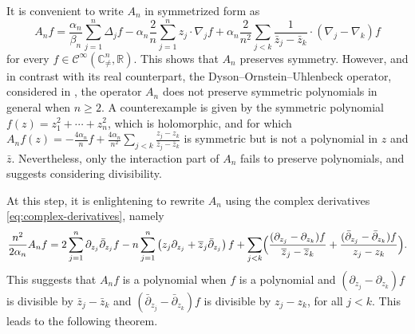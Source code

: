 \documentclass[11pt,reqno]{amsart}
\numberwithin{equation}{section}%
\numberwithin{figure}{section}%
\numberwithin{table}{section}
\theoremstyle{plain}
\theoremstyle{definition}
\begin{document}
It is convenient to write $A_n$ in symmetrized form as
\begin{equation}
  A_nf
  =\frac{\alpha_n}{\beta_n}\sum_{j=1}^n\Delta_jf
  -\alpha_n\frac{2}{n}\sum_{j=1}^nz_j\cdot\nabla_j f
  +\alpha_n\frac{2}{n^2}\sum_{j<k}\frac{1}{\bar{z}_j-\bar{z}_k}\cdot(\nabla_j-\nabla_k)f
\end{equation}
for every $f\in\mathcal{C}^\infty(\mathbb{C}^n_{\neq},\mathbb{R})$. This shows
that $A_n$ preserves symmetry. However, and in contrast with its real
counterpart, the Dyson--Ornstein--Uhlenbeck operator, considered in
\cite{ChafaiLehec}, the operator $A_n$ does not preserve symmetric polynomials
in general when $n\geq2$. A counterexample is given by the symmetric
polynomial $f(z)=z_1^2+\cdots+z_n^2$, which is holomorphic, and for which
$A_nf(z)=-\frac{4\alpha_n}{n}f+\frac{4\alpha_n}{n^2}\sum_{j<k}\frac{z_j-z_k}{\bar{z}_j-\bar{z}_k}$
is symmetric but is not a polynomial in $z$ and $\bar{z}$. Nevertheless, only
the interaction part of $A_n$ fails to preserve polynomials, and suggests
considering divisibility.

At this step, it is enlightening to rewrite $A_n$ using the complex
derivatives \eqref{eq:complex-derivatives}, namely
\begin{equation}\label{eq:An:complex}
  \frac{n^2}{2\alpha_n}A_nf
  =2
  \sum_{j=1}^n\partial_{z_j}\bar\partial_{z_j}f
  -n
  \sum_{j=1}^n \left(z_j\partial_{z_j}+\overline z_j\bar\partial_{z_j}\right)f
  +\sum_{j<k}\Bigl( \frac{(\partial_{z_j}-\partial_{z_k})f} {\overline z_j-\overline z_k}
  + \frac{(\bar\partial_{z_j}-\bar\partial_{z_k})f} {z_j-z_k} \Bigr).
\end{equation}
This suggests that $A_nf$ is a polynomial when $f$ is a polynomial and
$(\partial_{z_j}-\partial_{z_k})f$ is divisible by $\bar{z}_j-\bar{z}_k$ and
$(\bar\partial_{z_j}-\bar\partial_{z_k})f$ is divisible by $z_j-z_k$, for all $j<k$.
This leads to the following theorem.
\end{document}
